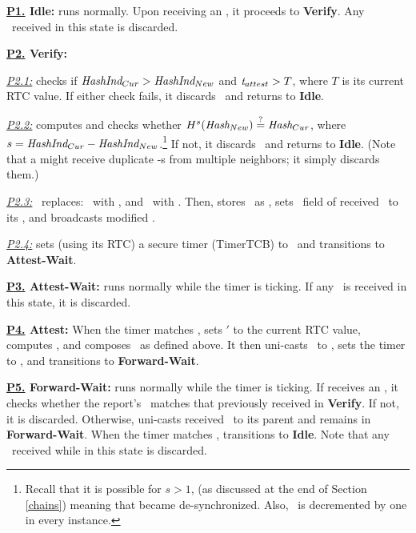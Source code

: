 \begin{compactitem}[]
%
    \item {\bf \underline{\bf P1.} Idle:} \prv runs normally. Upon receiving an \Attreq, it 
    proceeds to \textbf{Verify}. Any \Attrep\ received in this state is discarded.
%
    \item {\bf \underline{\bf P2.} Verify:} 
    \begin{compactitem}[]
        \item \underline{\it P2.1:} \prv checks if $\textit {HashInd$_{Cur}$}>\textit {HashInd$_{New}$}$ and $\textit{t$_{attest}$}>T$,
    where $T$ is its current RTC value. If either check fails, it discards \Attreq\ and 
    returns to {\bf Idle}. 
        \item \underline{\it P2.2:} \prv computes and checks whether $H^s(\textit{Hash$_{New}$}) \stackrel{?}{=} 
    \textit{Hash$_{Cur}$}$, where $s=\textit {HashInd$_{Cur}$}-\textit {HashInd$_{New}$}$.\footnote{Recall that it is possible for $s>1$,
    (as discussed at the end of Section \ref{chains}) meaning that \prv became de-synchronized.
    Also, \hashind\ is decremented by one in every \ra instance.}
    If not, it discards \Attreq\ and returns to {\bf Idle}.
    (Note that a \prv might receive duplicate \Attreq-s from multiple neighbors; it simply discards them.)
    \item \underline{\it P2.3:} \prv\ replaces: \curhash\ with \hash, and \curhashind\ with \hashind. 
    Then, \prv stores \snd\ as \parent, sets \snd\ field of received \Attreq\ to its \devid, and 
    broadcasts modified \Attreq.
    \item \underline{\it P2.4:} \prv sets (using its RTC) a secure timer (TimerTCB) to \attesttime\ 
    and transitions to \textbf{Attest-Wait}.
    \end{compactitem} 
%
     \item {\bf \underline{\bf P3.} Attest-Wait:} \prv runs normally while the timer is ticking. 
     If any \Attreq\ is received in this state, it is discarded. 
%
    \item {\bf \underline{\bf P4.} Attest:} When the timer matches \attesttime, \prv sets {\it \attesttime$'$} 
    to the current RTC value, computes \Authrep{}, and composes 
    \Attrep\ as defined above. It then uni-casts \Attrep\ to \parent{}, sets the timer 
    to \maxdelay, and transitions to \textbf{Forward-Wait}.
%    
    \item {\bf \underline{\bf P5.} Forward-Wait:} \prv runs normally while the timer is ticking. If \prv 
    receives an \Attrep, it checks whether the report's \hash\ matches that previously received 
    in \textbf{Verify}. If not, it is discarded. Otherwise, \prv uni-casts received \Attrep\  
    to its parent and remains in \textbf{Forward-Wait}. When the timer matches \maxdelay, \prv transitions 
    to \textbf{Idle}. Note that any \Attreq \ received while in this state 
    is discarded. 
%
\end{compactitem}

